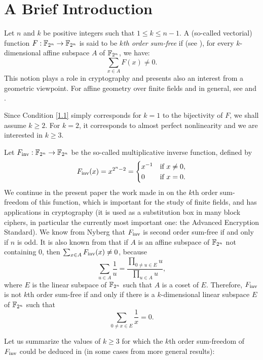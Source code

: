 \documentclass{amsart}
\numberwithin{equation}{section}
\theoremstyle{definition}
\newcommand{\f}{\Bbb F}
\newcommand{\fin}{F_{\text{\rm inv}}}
\begin{document}
\section{A Brief Introduction}
Let $n$ and $k$ be positive integers such that $1\le k\le n-1$. A (so-called vectorial)  function $F:\f_{2^n}\to\f_{2^n}$ is said to be {\em $k$th order sum-free} if (see \cite{Carlet-0}), for every $k$-dimensional affine subspace $A$ of $\f_{2^n}$, we have:
\begin{equation}\label{1.1} 
\sum_{x\in A}F(x)\ne 0.
\end{equation}This notion plays a role in cryptography and presents also an interest from a geometric viewpoint. For affine geometry over finite fields and in general, see \cite[Chapter 3]{AK1} and \cite[Section 2.2]{AK2}.

Since Condition \eqref{1.1} simply corresponds for $k=1$ to the bijectivity of $F$, we shall assume $k\geq 2$. For $k=2$, it corresponds to almost perfect nonlinearity \cite{CC-Nyberg-ter} and we are interested in $k\geq 3$.

Let $\fin:\f_{2^n}\to\f_{2^n}$ be the so-called multiplicative inverse function, defined by
\[
\fin(x)=x^{2^n-2}=\begin{cases}
x^{-1}&\text{if}\ x\ne 0,\cr
0&\text{if}\ x=0.
\end{cases}
\]We continue in the present paper the work made in \cite{Carlet-pre} on the $k$th order sum-freedom of this function, which  is important for the study of finite fields, and has applications in cryptography (it is used as a substitution box in many block ciphers, in particular the currently most important one: the Advanced Encryption Standard). We know from Nyberg \cite{CC-Nyberg-ter} that $\fin$ is second order sum-free if and only if $n$ is odd.
It is also known from \cite{Carlet-0} that if $A$ is an affine subspace of $\f_{2^n}$ not containing $0$, then $\sum_{x\in A}\fin(x)\ne 0$, because 
\[
\sum_{u\in A}\frac 1u=\frac{\prod_{0\ne u\in E}u}{\prod_{u\in A}u},
\]
where $E$ is the linear subspace of $\f_{2^n}$ such that $A$ is a coset of $E$. Therefore, $\fin$ is not $k$th order sum-free if and only if there is a $k$-dimensional linear subspace $E$ of $\f_{2^n}$ such that
\begin{equation}\label{1.2}
\sum_{0\ne x\in E}\frac 1x=0.
\end{equation}

\medskip
Let us summarize the values of $k\geq 3$ for which the $k$th order sum-freedom of $\fin$ could be deduced in \cite{Carlet-0,Carlet-pre} (in some cases from more general results):
\end{document}
